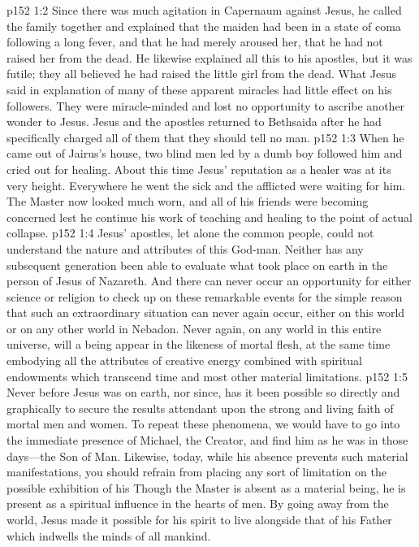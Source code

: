\vs p152 1:2 Since there was much agitation in Capernaum against Jesus, he called the family together and explained that the maiden had been in a state of coma following a long fever, and that he had merely aroused her, that he had not raised her from the dead. He likewise explained all this to his apostles, but it was futile; they all believed he had raised the little girl from the dead. What Jesus said in explanation of many of these apparent miracles had little effect on his followers. They were miracle\hyp{}minded and lost no opportunity to ascribe another wonder to Jesus. Jesus and the apostles returned to Bethsaida after he had specifically charged all of them that they should tell no man.
\pc \vs p152 1:3 When he came out of Jairus’s house, two blind men led by a dumb boy followed him and cried out for healing. About this time Jesus’ reputation as a healer was at its very height. Everywhere he went the sick and the afflicted were waiting for him. The Master now looked much worn, and all of his friends were becoming concerned lest he continue his work of teaching and healing to the point of actual collapse.
\pc \vs p152 1:4 Jesus’ apostles, let alone the common people, could not understand the nature and attributes of this God\hyp{}man. Neither has any subsequent generation been able to evaluate what took place on earth in the person of Jesus of Nazareth. And there can never occur an opportunity for either science or religion to check up on these remarkable events for the simple reason that such an extraordinary situation can never again occur, either on this world or on any other world in Nebadon. Never again, on any world in this entire universe, will a being appear in the likeness of mortal flesh, at the same time embodying all the attributes of creative energy combined with spiritual endowments which transcend time and most other material limitations.\plusone
\vs p152 1:5 Never before Jesus was on earth, nor since, has it been possible so directly and graphically to secure the results attendant upon the strong and living faith of mortal men and women. To repeat these phenomena, we would have to go into the immediate presence of Michael, the Creator, and find him as he was in those days---the Son of Man. Likewise, today, while his absence prevents such material manifestations, you should refrain from placing any sort of limitation on the possible exhibition of his  Though the Master is absent as a material being, he is present as a spiritual influence in the hearts of men. By going away from the world, Jesus made it possible for his spirit to live alongside that of his Father which indwells the minds of all mankind.
